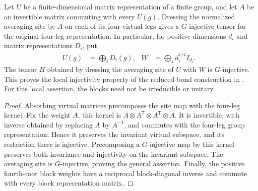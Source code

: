 \begin{lemma}%
    \label{thm:peps_torus_weighted_site_g_injective}
    \leanok
    Let $U$ be a finite-dimensional matrix representation of a finite group,
    and let $A$ be an invertible matrix commuting with every $U(g)$.
    Dressing the normalized averaging site by $A$ on each of its four virtual
    legs gives a $G$-injective tensor for the original four-leg representation.
    In particular, for positive dimensions $d_i$ and matrix representations $D_i$,
    put
    \begin{align}
        U(g) & =\bigoplus_iD_i(g),            &
        W    & =\bigoplus_i d_i^{1/4}I_{d_i}.
    \end{align}
    The tensor $H$ obtained by dressing the averaging site of $U$ with
    $W$ is $G$-injective. This proves the local injectivity property of the
    reduced-bond construction in \cite[Section~7]{Schuch2010PEPS}.
    For this local assertion, the blocks need not be irreducible or unitary.
\end{lemma}

\begin{proof}\leanok
    Absorbing virtual matrices precomposes the site map with the
    four-leg kernel. For the weight $A$, this kernel is
    $A\otimes A^{\mathsf T}\otimes A^{\mathsf T}\otimes A$.
    It is invertible, with inverse obtained by replacing $A$ by $A^{-1}$,
    and commutes with the four-leg group representation.
    Hence it preserves the invariant virtual subspace, and its restriction
    there is injective. Precomposing a $G$-injective map by this kernel
    preserves both invariance and injectivity on the invariant subspace.
    The averaging site is $G$-injective, proving the general assertion.
    Finally, the positive fourth-root block weights have a reciprocal
    block-diagonal inverse and commute with every block representation matrix.
\end{proof}
